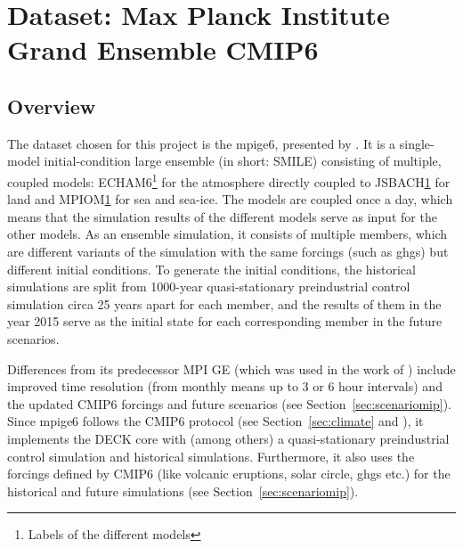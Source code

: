 

\chapter{Dataset: Max Planck Institute Grand Ensemble CMIP6}
\label{ch:dataset}

\section{Overview}

The dataset chosen for this project is the \ac{mpige6}, presented by \cite{olonscheck_new_2023}. 
It is a single-model initial-condition large ensemble (in short: SMILE) consisting of multiple, coupled models: ECHAM6\footnote{\label{fn:modelname}Labels of the different models} for the atmosphere directly coupled to JSBACH\cref{fn:modelname} for land and MPIOM\cref{fn:modelname} for sea and sea-ice. 
The models are coupled once a day, which means that the simulation results of the different models serve as input for the other models.
As an ensemble simulation, it consists of multiple members, which are different variants of the simulation with the same forcings (such as \acp{ghg}) but different initial conditions. 
To generate the initial conditions, the historical simulations are split from 1000-year quasi-stationary preindustrial control simulation circa 25 years apart for each member, and the results of them in the year 2015 serve as the initial state for each corresponding member in the future scenarios. \cite{olonscheck_new_2023}

 

Differences from its predecessor MPI GE \cite{maher_max_2019} (which was used in the work of \citeauthor{vietinghoffdiss} \cite{vietinghoffdiss}) include improved time resolution (from monthly means up to 3 or 6 hour intervals) and the updated CMIP6 forcings and future scenarios (see Section~\ref{sec:scenariomip}). 
Since \ac{mpige6} follows the CMIP6 protocol (see Section~\ref{sec:climate} and \cite{eyring_overview_2016}), it implements the DECK core with (among others) a quasi-stationary preindustrial control simulation and historical simulations.
Furthermore, it also uses the forcings defined by CMIP6 (like volcanic eruptions, solar circle, \acp{ghg} etc.) for the historical and future simulations (see Section~\ref{sec:scenariomip}).




